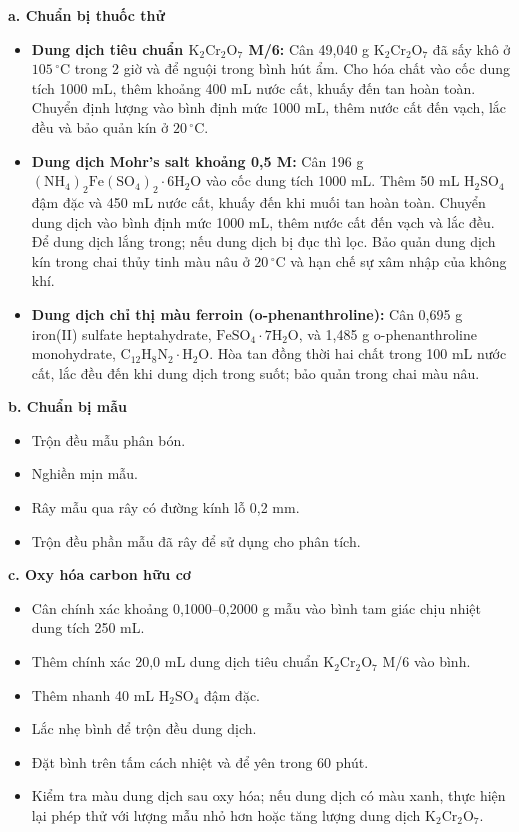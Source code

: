 \noindent\textbf{a. Chuẩn bị thuốc thử}
\begin{itemize}
  \item \textbf{Dung dịch tiêu chuẩn \(\mathrm{K_2Cr_2O_7}\) M/6:} Cân 49,040 g \(\mathrm{K_2Cr_2O_7}\) đã sấy khô ở $105\,^{\circ}\mathrm{C}$ trong 2 giờ và để nguội trong bình hút ẩm. Cho hóa chất vào cốc dung tích 1000 mL, thêm khoảng 400 mL nước cất, khuấy đến tan hoàn toàn. Chuyển định lượng vào bình định mức 1000 mL, thêm nước cất đến vạch, lắc đều và bảo quản kín ở $20\,^{\circ}\mathrm{C}$.
  \item \textbf{Dung dịch Mohr's salt khoảng 0,5 M:} Cân 196 g \(\mathrm{(NH_4)_2Fe(SO_4)_2\cdot 6H_2O}\) vào cốc dung tích 1000 mL. Thêm 50 mL \(\mathrm{H_2SO_4}\) đậm đặc và 450 mL nước cất, khuấy đến khi muối tan hoàn toàn. Chuyển dung dịch vào bình định mức 1000 mL, thêm nước cất đến vạch và lắc đều. Để dung dịch lắng trong; nếu dung dịch bị đục thì lọc. Bảo quản dung dịch kín trong chai thủy tinh màu nâu ở $20\,^{\circ}\mathrm{C}$ và hạn chế sự xâm nhập của không khí.
  \item \textbf{Dung dịch chỉ thị màu ferroin (o-phenanthroline):} Cân 0,695 g iron(II) sulfate heptahydrate, \(\mathrm{FeSO_4\cdot 7H_2O}\), và 1,485 g o-phenanthroline monohydrate, \(\mathrm{C_{12}H_8N_2\cdot H_2O}\). Hòa tan đồng thời hai chất trong 100 mL nước cất, lắc đều đến khi dung dịch trong suốt; bảo quản trong chai màu nâu.
\end{itemize}

\noindent\textbf{b. Chuẩn bị mẫu}
\begin{itemize}
  \item Trộn đều mẫu phân bón.
  \item Nghiền mịn mẫu.
  \item Rây mẫu qua rây có đường kính lỗ 0,2 mm.
  \item Trộn đều phần mẫu đã rây để sử dụng cho phân tích.
\end{itemize}

\noindent\textbf{c. Oxy hóa carbon hữu cơ}
\begin{itemize}
  \item Cân chính xác khoảng 0,1000--0,2000 g mẫu vào bình tam giác chịu nhiệt dung tích 250 mL.
  \item Thêm chính xác 20,0 mL dung dịch tiêu chuẩn \(\mathrm{K_2Cr_2O_7}\) M/6 vào bình.
  \item Thêm nhanh 40 mL \(\mathrm{H_2SO_4}\) đậm đặc.
  \item Lắc nhẹ bình để trộn đều dung dịch.
  \item Đặt bình trên tấm cách nhiệt và để yên trong 60 phút.
  \item Kiểm tra màu dung dịch sau oxy hóa; nếu dung dịch có màu xanh, thực hiện lại phép thử với lượng mẫu nhỏ hơn hoặc tăng lượng dung dịch \(\mathrm{K_2Cr_2O_7}\).
\end{itemize}

